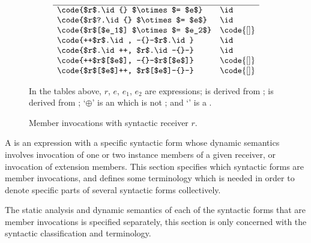 \documentclass[makeidx]{article}
\begin{document}
{\begin{figure}[h]
\begin{minipage}[t]{\textwidth}
\begin{displaymath}
\begin{array}[t]{ll}
        \hline
        \code{$r$.\id{} $\otimes$= $e$}      & \id \\
        \code{$r$?.\id{} $\otimes$= $e$}     & \id \\
        \code{$r$[$e_1$] $\otimes$= $e_2$}  & \code{[]} \\
        \code{++$r$.\id, -{}-$r$.\id}       & \id \\
        \code{$r$.\id++, $r$.\id-{}-}       & \id \\
        \code{++$r$[$e$], -{}-$r$[$e$]}     & \code{[]} \\
        \code{$r$[$e$]++, $r$[$e$]-{}-}     & \code{[]}
      \end{array}
    \end{displaymath}
  \end{minipage}

  \vspace{4mm}
  \begin{minipage}[t]{\textwidth}
    \small
    In the tables above,
    $r$, $e$, $e_1$, $e_2$ are expressions;
     is derived from ;
     is derived from ;
    `$\oplus$' is an  which is not \lit{==};
    and `\code{$\otimes$=}' is a .
  \end{minipage}
  \caption{Member invocations with syntactic receiver $r$.}
  \label{fig:memberInvocations}
\end{figure}

\LMHash{}%
A  is an expression with a specific syntactic form
whose dynamic semantics involves invocation of
one or two instance members of a given receiver,
or invocation of extension members.
This section specifies which syntactic forms are member invocations,
and defines some terminology
which is needed in order to denote
specific parts of several syntactic forms collectively.

\LMHash{}%
The static analysis and dynamic semantics of
each of the syntactic forms that are member invocations
is specified separately,
this section is only concerned with
the syntactic classification and terminology.


}
\end{document}
